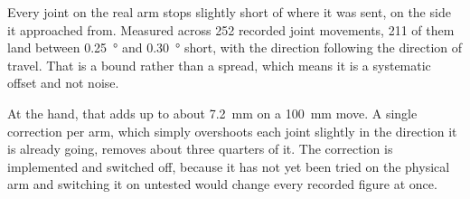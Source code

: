Every joint on the real arm stops slightly short of where it was sent, on the
side it approached from. Measured across 252 recorded joint movements, 211 of
them land between \SI{0.25}{\degree} and \SI{0.30}{\degree} short, with the
direction following the direction of travel. That is a bound rather than a
spread, which means it is a systematic offset and not noise.

At the hand, that adds up to about \SI{7.2}{\milli\metre} on a
\SI{100}{\milli\metre} move. A single correction per arm, which simply
overshoots each joint slightly in the direction it is already going, removes
about three quarters of it. The correction is implemented and switched off,
because it has not yet been tried on the physical arm and switching it on
untested would change every recorded figure at once.
